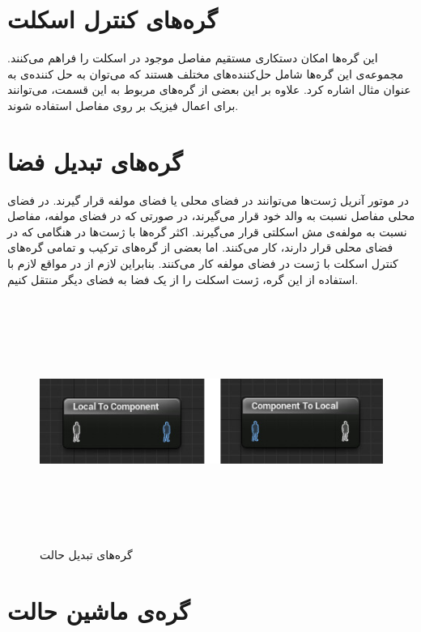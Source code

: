 \cite{BlendNodeUnrealEngine}


\section{گره‌های کنترل اسکلت}

این گره‌ها امکان دستکاری مستقیم مفاصل موجود در اسکلت را فراهم می‌کنند.
مجموعه‌ی این گره‌ها شامل حل‌کننده‌های مختلف هستند که می‌توان به 
حل کننده‌ی 
به عنوان مثال اشاره کرد.
علاوه بر این بعضی از گره‌های مربوط به این قسمت، می‌توانند برای اعمال فیزیک بر روی 
مفاصل استفاده شوند.
\cite{SkeletalControlsUnrealEngine}

\section{گره‌های تبدیل فضا}

در موتور آنریل ژست‌ها می‌توانند در فضای محلی یا فضای مولفه قرار گیرند.
در فضای محلی مفاصل نسبت به والد خود قرار می‌گیرند، در صورتی که 
در فضای مولفه، مفاصل نسبت به مولفه‌ی مش اسکلتی 
قرار می‌گیرند.
اکثر گره‌ها با ژست‌ها در هنگامی که در فضای محلی قرار دارند، کار می‌کنند.
اما بعضی از گره‌های ترکیب و تمامی گره‌های کنترل اسکلت 
با ژست در فضای مولفه کار می‌کنند. بنابراین لازم از در مواقع لازم با استفاده از 
این گره، ژست اسکلت را از یک فضا به فضای دیگر منتقل کنیم.
\cite{ChangeSpaceUnrealEngine}

\begin{figure}[ht]
	\centerline{\includegraphics[width=\textwidth,height=8cm,keepaspectratio]{Figures/Ch3/ChnageSpaceNodes.png}}\hfill
	\caption{ گره‌های تبدیل حالت }
	\label{fig:ChnageSpaceNodes}
\end{figure}

\section{گره‌‌ی ماشین حالت}

